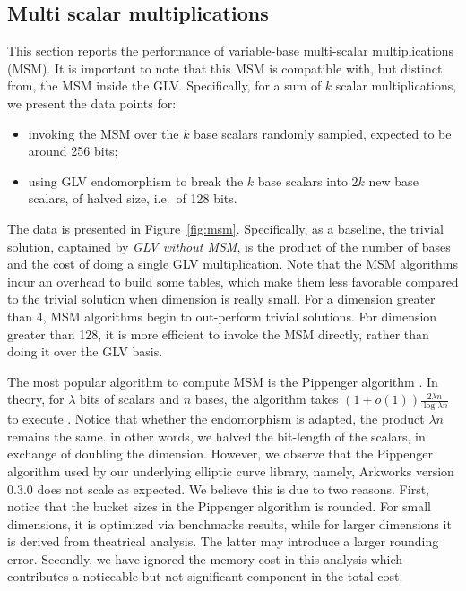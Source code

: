 \documentclass[smallextended]{svjour3}
\begin{document}
\subsection{Multi scalar multiplications}
This section reports the performance of variable-base multi-scalar multiplications (MSM). It is important to note that this MSM is compatible with, but distinct from, the MSM inside the GLV. Specifically, for a sum of $k$ scalar multiplications, we present the data points for:

\begin{itemize}
  \item invoking the MSM over the $k$ base scalars randomly sampled,
    expected to be around 256 bits;
  \item using GLV endomorphism to break the $k$ base scalars into $2k$
    new base scalars, of halved size, i.e.~of 128 bits.
\end{itemize}
The data is presented in Figure~\ref{fig:msm}. Specifically, 
as a baseline, the trivial solution, captained by 
{\em GLV without 
MSM}, is the product of the number of bases and the cost of
doing a single GLV multiplication. 
Note that the MSM algorithms incur an overhead to build some
tables, which make them less favorable compared to the trivial
solution when dimension is really small. For a dimension greater 
than 4, MSM algorithms begin to out-perform trivial solutions.
For dimension greater than 128, it is more efficient to 
invoke the MSM directly, rather than doing it over the GLV basis.


The most popular algorithm to compute MSM is the Pippenger algorithm \cite{pip80}. 
In theory, for $\lambda$ bits of scalars and $n$ bases, the algorithm takes
$(1 + o(1))\frac{2\lambda n}{\log \lambda n}$ to execute \cite{msm}.
Notice that whether the endomorphism is adapted, the product $\lambda n$ 
remains the same. in other words, we halved the bit-length of the scalars,
in exchange of doubling the dimension. However, we observe that the 
Pippenger algorithm used by our underlying elliptic curve library, 
namely, Arkworks version 0.3.0 \cite{arkworks} does not scale as expected.
We believe this is due to two reasons. First, notice that the bucket sizes 
in the Pippenger algorithm is rounded. 
For small dimensions, it is optimized via benchmarks results, while for larger 
dimensions it is derived from theatrical analysis. The latter may 
introduce a larger rounding error. Secondly, we have ignored the memory
cost in this analysis which contributes a noticeable but not significant 
component in the total cost.
\end{document}
